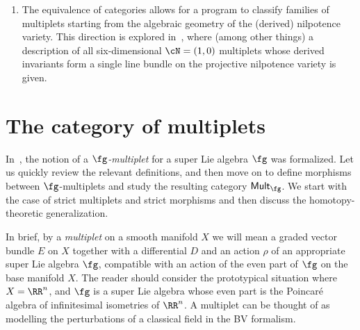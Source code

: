 \documentclass[10pt,a4paper]{amsart}
\numberwithin{equation}{section}
\def\cat#1{\ensuremath{\mathsf{#1}}}
\DeclareMathOperator{\Mult}{\cat{Mult}}
\begin{document}
\begin{enumerate}
	To give a further example, the tangent sheaf $\mathrm{Der}(C^\bullet(\fn))$ carries a Lie bracket for all supertranslation algebras $\fn$. While the associated multiplet is not generally associated to a BV theory---it does not typically carry a $-1$-shifted symplectic pairing---one can always build a BV theory by applying the cotangent theory construction and considering the multiplet $M \otimes M^![-1]$, where $M^! = M^* \otimes \Omega^{\mathrm{top}}(V)$ is the density-valued dual. This procedure allows for the construction of a very general family of interacting classical supersymmetric field theories.
	
	\item The equivalence of categories allows for a program to classify families of multiplets starting from the algebraic geometry of the (derived) nilpotence variety. This direction is explored in~\cite{HNSW6d}, where (among other things) a description of all six-dimensional $\cN=(1,0)$ multiplets whose derived invariants form a single line bundle on the projective nilpotence variety is given.
\end{enumerate}


\section{The category of multiplets} \label{sec: multiplets}
In~\cite{perspectives}, the notion of a \emph{$\fg$-multiplet} for a super Lie algebra $\fg$ was formalized. Let us quickly review the relevant definitions, and then move on to define morphisms between $\fg$-multiplets and study the resulting category $\Mult_{\fg}$. We start with the case of strict multiplets and strict morphisms and then discuss the homotopy-theoretic generalization.

In brief, by a \emph{multiplet} on a smooth manifold $X$ we will mean a graded vector bundle $E$ on $X$ together with a differential $D$ and an action $\rho$ of an appropriate super Lie algebra $\fg$, compatible with an action of the even part of $\fg$ on the base manifold $X$. The reader should consider the prototypical situation where $X = \RR^n$, and $\fg$ is a super Lie algebra whose even part is the Poincar\'e algebra of infinitesimal isometries of $\RR^n$. A multiplet can be thought of as modelling the perturbations of a classical field in the BV formalism.
\end{document}
